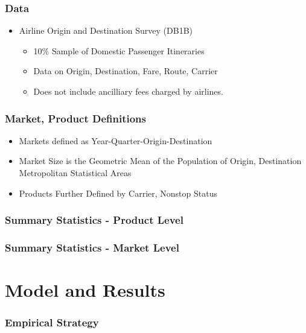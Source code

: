 \documentclass[xcolor=dvipsnames]{beamer}
\begin{document}
    \begin{frame}
		\frametitle{Data}
		\begin{itemize}
			\item Airline Origin and Destination Survey (DB1B)
			\begin{itemize}
				\item 10\% Sample of Domestic Passenger Itineraries 
				\item Data on Origin, Destination, Fare, Route, Carrier
                \item Does not include ancilliary fees charged by airlines. 
			\end{itemize}
		\end{itemize}
	\end{frame}

    \begin{frame}
        \frametitle{Market, Product Definitions}
        \begin{itemize}
        	\item Markets defined as Year-Quarter-Origin-Destination 
			\item Market Size is the Geometric Mean of the Population of Origin, Destination Metropolitan Statistical Areas
			\item Products Further Defined by Carrier, Nonstop Status
        \end{itemize}
    \end{frame}

    \begin{frame}
        \frametitle{Summary Statistics - Product Level}
        
    \end{frame}

    \begin{frame}
        \frametitle{Summary Statistics - Market Level}
       \tiny
        \centering
        \begin{adjustbox}{max height=\dimexpr\textheight-5.5cm\relax,
           max width=\textwidth}

\end{adjustbox}
    \end{frame}

    \section{Model and Results}

    \begin{frame}
        \frametitle{Empirical Strategy}
        
    \end{frame}
    
\end{document}
